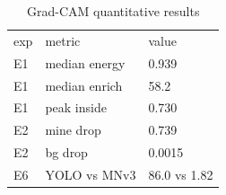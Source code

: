 \begin{table}[t]\centering\small\caption{Grad-CAM quantitative results}
\label{tab:t5gradcam}
\begin{tabular}{|lll|}\hline
exp & metric & value\\
E1 & median energy & 0.939\\
E1 & median enrich & 58.2\\
E1 & peak inside & 0.730\\
E2 & mine drop & 0.739\\
E2 & bg drop & 0.0015\\
E6 & YOLO vs MNv3 & 86.0 vs 1.82\\
\hline\end{tabular}\end{table}
